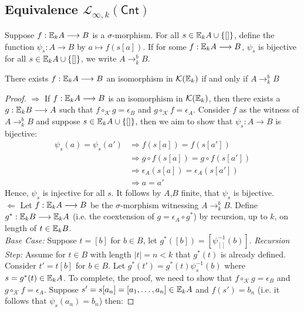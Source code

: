 \subsection{Equivalence $\mathcal{L}_{\infty,k}(\mathsf{Cnt})$} 
Suppose $f:{\mathbb{E}_{k}A} \longrightarrow B$ is a $\sigma$-morphism. For all $s \in {\mathbb{E}_{k}A} \cup \{[]\}$, define the function $\psi_{s}:A \longrightarrow B$ by $a \mapsto f(s[a])$. If for some $f:{\mathbb{E}_{k}A} \longrightarrow B$, $\psi_{s}$ is bijective for all $s \in {\mathbb{E}_{k}A} \cup \{[]\}$, we write $A \rightarrow_{k}^{b} B$.
\begin{prop}
There exists $f:{\mathbb{E}_{k}A} \longrightarrow B$ an isomorphism in $\mathcal{K}({\mathbb{E}_{k}})$ if and only if $A \rightarrow_{k}^{b} B$
\begin{proof}
$\Rightarrow$ If $f:{\mathbb{E}_{k}A} \longrightarrow B$ is an isomorphism in $\mathcal{K}({\mathbb{E}_{k}})$, then there exists a $g:{\mathbb{E}_{k}B} \longrightarrow A$ such that $f \circ_{\mathcal{K}} g = \epsilon_{B}$ and $g \circ_{\mathcal{K}} f = \epsilon_{A}$. Consider $f$ as the witness of $A \rightarrow_{k}^{b} B$ and suppose $s \in {\mathbb{E}_{k}A} \cup \{[]\}$, then we aim to show that $\psi_{s}:A \longrightarrow B$ is bijective:  
\begin{align*}
\psi_{s}(a) = \psi_{s}(a') &\Rightarrow f(s[a]) = f(s[a']) \\
&\Rightarrow g \circ f(s[a]) = g \circ f(s[a']) \\
&\Rightarrow \epsilon_{A}(s[a]) = \epsilon_{A}(s[a']) \\
&\Rightarrow a = a' 
\end{align*}
Hence, $\psi_{s}$ is injective for all $s$. It follows by $A$,$B$ finite, that $\psi_{s}$ is bijective. \\
$\Leftarrow$ Let $f:{\mathbb{E}_{k}A} \longrightarrow B$ be the $\sigma$-morphism witnessing $A \rightarrow_{k}^{b} B$. Define $g^{*}:{\mathbb{E}_{k}B} \longrightarrow {\mathbb{E}_{k}A}$ (i.e. the coextension of $g = \epsilon_{A} \circ g^{*}$) by recursion, up to $k$, on length of $t \in {\mathbb{E}_{k}B}$. \\   
\textit{Base Case:} Suppose $t = [b]$ for $b \in B$, let $g^{*}([b]) = [\psi_{[]}^{-1}(b)]$.
\textit{Recursion Step:} Assume for $t \in B$ with length $|t| = n < k$ that $g^{*}(t)$ is already defined. Consider $t' = t[b]$ for $b \in B$. Let $g^{*}(t') = g^{*}(t)\psi_{s}^{-1}(b)$ where $s = g^{*}(t) \in {\mathbb{E}_{k}A}$. To complete, the proof, we need to show that $f \circ_{\mathcal{K}} g = \epsilon_{B}$ and $g \circ_{\mathcal{K}} f = \epsilon_{A}$. Suppose $s' = s[a_{n}] = [a_{1},\dots,a_{n}] \in {\mathbb{E}_{k}A}$ and $f(s') = b_{n}$ (i.e. it follows that $\psi_{s}(a_{n}) = b_{n}$) then: 

\end{proof}
\end{prop}
